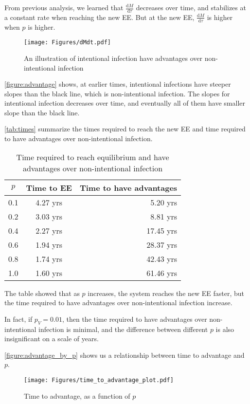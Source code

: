 \documentclass[12pt]{article}
\newcommand\dbyd[2]{\frac{\mathrm d{#1}}{\mathrm d{#2}}}
\newcommand{\pmV}{p_{V}}
\begin{document}
From previous analysis, we learned that $\dbyd{M}{\tau}$ decreases over time, and stabilizes at a constant rate when reaching the new EE. But at the new EE, $\dbyd{M}{\tau}$ is higher when $p$ is higher. 

\begin{figure}[H]
  \centering
  \texttt{[image: Figures/dMdt.pdf]}
  \caption{An illustration of intentional infection have advantages over non-intentional infection}
\label{figure:advantage}
\end{figure}

\autoref{figure:advantage} shows, at earlier times, intentional infections have steeper slopes than the black line, which is non-intentional infection. The slopes for intentional infection decreases over time, and eventually all of them have smaller slope than the black line.

\autoref{tab:times} summarize the times required to reach the new EE and time required to have advantages over non-intentional infection.

\begin{table}[H]
\begin{center}
\caption{Time required to reach equilibrium and have advantages over non-intentional infection}
\label{tab:times}
\smallskip
\begin{tabular}{c|c|r}
{\bfseries $p$} & {\bfseries Time to EE} & {\bfseries Time to have advantages} \\\hline
0.1 & 4.27 yrs & 5.20 yrs \\
0.2 & 3.03 yrs & 8.81 yrs \\
0.4 & 2.27 yrs & 17.45 yrs \\
0.6 & 1.94 yrs & 28.37 yrs \\
0.8 & 1.74 yrs & 42.43 yrs \\
1.0 & 1.60 yrs & 61.46 yrs
\end{tabular}
\end{center}
\end{table}
The table showed that as $p$ increases, the system reaches the new EE faster, but the time required to have advantages over non-intentional infection increase.

In fact, if $\pmV=0.01$, then the time required to have advantages over non-intentional infection is minimal, and the difference between different $p$ is also insignificant on a scale of years.

\autoref{figure:advantage_by_p} shows us a relationship between time to advantage and $p$.
\begin{figure}[H]
  \centering
  \texttt{[image: Figures/time\_to\_advantage\_plot.pdf]}
  \caption{Time to advantage, as a function of $p$}
\label{figure:advantage_by_p}
\end{figure}
\end{document}
